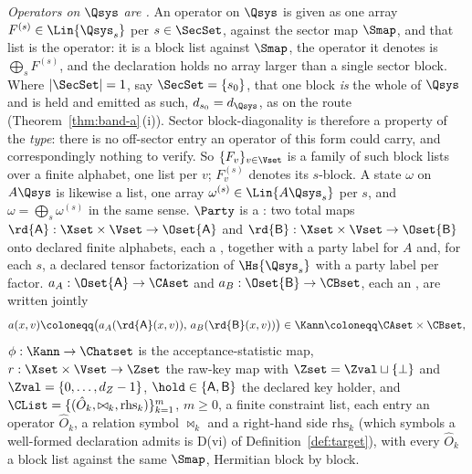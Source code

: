 \begin{definition}
\emph{Operators on $\Qsys$ are .} An operator
on $\Qsys$ is given as one array $F^{(s)}\in\Lin{\Qsys_s}$ per
$s\in\SecSet$, against the sector map $\Smap$, and that list is the
operator: it is a block list against $\Smap$, the operator it denotes is
$\bigoplus_{s}F^{(s)}$, and the
declaration holds no array larger than a single sector block. Where
$|\SecSet|=1$, say $\SecSet=\{s_0\}$, that one block \emph{is} the whole of
$\Qsys$ and is held and emitted as such, $d_{s_0}=d_{\Qsys}$, as on the
 route (Theorem~\ref{thm:band-a}\,(i)). Sector block-diagonality is therefore a
property of the \emph{type}: there is no off-sector entry an operator of this
form could carry, and correspondingly nothing to verify. So
$\{F_v\}_{v\in\Vset}$ is a family of such block lists over a finite alphabet,
one list per $v$; $F_v^{(s)}$ denotes its $s$-block. A state $\omega$ on
$A\Qsys$ is likewise a list, one array $\omega^{(s)}\in\Lin{A\Qsys_s}$ per
$s$, and $\omega=\bigoplus_s\omega^{(s)}$ in the same sense. $\Party$ is a
:
two total maps $\rd{\mathsf A}:\Xset\times\Vset\to\Oset{\mathsf A}$ and
$\rd{\mathsf B}:\Xset\times\Vset\to\Oset{\mathsf B}$ onto declared finite
alphabets, each a
,
together with a party label for $A$ and, for each $s$, a declared tensor
factorization of $\Hs{\Qsys_s}$ with a party label per factor.
$a_A:\Oset{\mathsf A}\to\CAset$ and $a_B:\Oset{\mathsf B}\to\CBset$, each an
,
are written jointly
\begin{equation}\label{eq:jointann}
  a(x,v)\coloneqq\big(a_A(\rd{\mathsf A}(x,v)),\,a_B(\rd{\mathsf B}(x,v))\big)
  \in\Kann\coloneqq\CAset\times\CBset ,
\end{equation}
$\phi:\Kann\to\Chatset$ is the acceptance-statistic map,
$r:\Xset\times\Vset\to\Zset$ the raw-key map with
$\Zset=\Zval\sqcup\{\perp\}$ and $\Zval=\{0,\dots,d_Z-1\}$,
$\hold\in\{\mathsf A,\mathsf B\}$ the declared key holder, and
$\CList=\{(\hat O_k,\bowtie_k,\mathrm{rhs}_k)\}_{k=1}^{m}$, $m\ge0$, a finite
constraint list, each entry an operator $\hat O_k$, a relation symbol
$\bowtie_k$ and a right-hand side $\mathrm{rhs}_k$ (which symbols a
well-formed declaration admits is D(vi) of Definition~\ref{def:target}),
with every $\hat O_k$ a block list against the same $\Smap$, Hermitian block
by block.


\end{definition}
